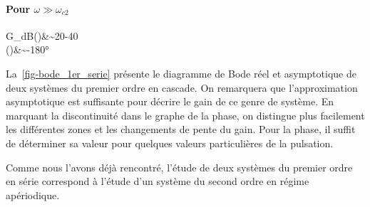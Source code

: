\paragraph{Pour $\omega\gg\omega_{c2}$}
\begin{bequation}
G_{dB}(\omega)&\sim20-40\\
\phi(\omega)&\sim-180\si{\degree}
\end{bequation}

La~\cref{fig-bode_1er_serie} présente le diagramme de Bode réel et 
asymptotique de deux systèmes du premier ordre en cascade. On remarquera 
que l'approximation asymptotique est suffisante pour décrire le gain de ce 
genre de système. En marquant la discontinuité dans le graphe de la phase, 
on distingue plus facilement les différentes zones et les changements de 
pente du gain. Pour la phase, il suffit de déterminer sa valeur pour 
quelques valeurs particulières de la pulsation. 

Comme nous l'avons déjà rencontré, l'étude de deux systèmes du premier 
ordre en série correspond à l'étude d'un système du second ordre en 
régime apériodique.

